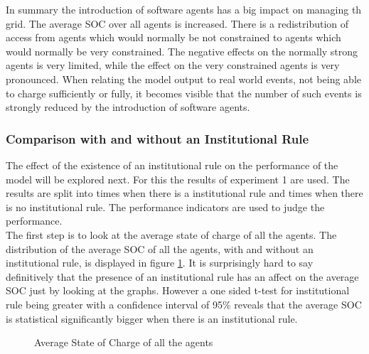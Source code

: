 \documentclass[a4paper]{article}
\begin{document}
In summary the introduction of software agents has a big impact on managing th grid. The average SOC over all agents is increased. There is 
a redistribution of access from agents which would normally be not constrained to agents  which would normally be very constrained. The 
negative effects on the normally strong agents is very limited, while the effect on the very constrained agents is very pronounced. 
When relating the model output to real world events, not being able to charge sufficiently or fully, it becomes visible that the number of
such events is strongly reduced by the introduction of software agents.

\newpage
\subsubsection{Comparison with and without an Institutional Rule}
The effect of the existence of an institutional rule on the performance of the model will be explored next. For 
this the results of experiment 1 are used. The results are split into times when there is a institutional rule and 
times when there is no institutional rule. The performance indicators are used to judge the performance. \\

The first step is to look at the average state of charge of all the agents. The distribution of the average SOC of all
the agents, with and without an institutional rule, is displayed in figure \ref{inst_averages_all_second}. It is surprisingly hard 
to say definitively that the presence of an institutional rule has an affect on the average SOC just by looking at the graphs.
However a one sided t-test for institutional rule being greater with a confidence interval of 95\% reveals that the average 
SOC is statistical significantly bigger when there is an institutional rule.
\begin{figure}[!ht]
\caption{Average State of Charge of all the agents}
\label{inst_averages_all_second}
\end{figure}
\end{document}
